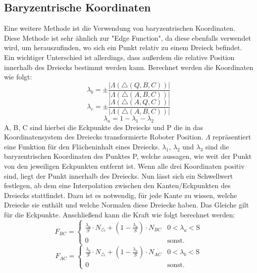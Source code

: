 \documentclass[conference]{IEEEtran}
\begin{document}
\subsection{Baryzentrische Koordinaten} \label{bary}
Eine weitere Methode ist die Verwendung von baryzentrischen Koordinaten. 
Diese Methode ist sehr ähnlich zur "Edge Function", da diese ebenfalls verwendet wird, um herauszufinden, 
wo sich ein Punkt relativ zu einem Dreieck befindet. Ein wichtiger Unterschied ist allerdings, dass 
außerdem die relative Position innerhalb des Dreiecks bestimmt werden kann. Berechnet werden die 
Koordinaten wie folgt:
\begin{equation*}
    \lambda_b = \pm\frac{|\Lambda(\triangle(Q,B,C))|}{|\Lambda(\triangle(A,B,C))|}
\end{equation*}
\begin{equation}
    \lambda_c = \pm\frac{|\Lambda(\triangle(A,Q,C))|}{|\Lambda(\triangle(A,B,C))|}
\end{equation}
\begin{equation*}
    \lambda_a = 1 - \lambda_1 - \lambda_2
\end{equation*}
A, B, C sind hierbei die Eckpunkte des Dreiecks und P die in das Koordinatensystem des Dreiecks 
transformierte Roboter Position. $\Lambda$ repräsentiert eine Funktion für den Flächeninhalt eines Dreiecks. 
$\lambda_1$, $\lambda_2$ und $\lambda_3$ sind die baryzentrischen Koordinaten des Punktes P, welche aussagen, 
wie weit der Punkt von den jeweiligen Eckpunkten entfernt ist. 
Wenn alle drei Koordinaten positiv sind, liegt der Punkt innerhalb des Dreiecks. Nun lässt sich ein 
Schwellwert festlegen, ab dem eine Interpolation zwischen den Kanten/Eckpunkten des Dreiecks stattfindet. 
Dazu ist es notwendig, für jede Kante zu wissen, welche Dreiecke sie enthält und welche Normalen diese 
Dreiecke haben. Das Gleiche gilt für die Eckpunkte. Anschließend kann die Kraft wie folgt 
berechnet werden:
\begin{equation*}
    F_{BC} = 
    \begin{cases} 
        \frac{\lambda_a}{S}\cdot N_{\triangle} + (1-\frac{\lambda_a}{S})\cdot N_{BC} &  0 < \lambda_a < \text{S} \\
        0 & \text{sonst.}
    \end{cases}
\end{equation*}
\begin{equation*}
    F_{AC} = 
    \begin{cases} 
        \frac{\lambda_b}{S}\cdot N_{\triangle} + (1-\frac{\lambda_a}{S})\cdot N_{AC} &  0 < \lambda_b < \text{S} \\
        0 & \text{sonst.}
    \end{cases}
\end{equation*}
\end{document}

